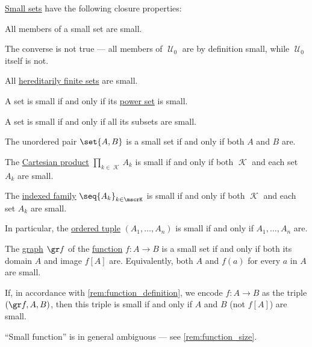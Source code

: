 \begin{proposition}\label{thm:small_set_closure}
  \hyperref[def:small_set]{Small sets} have the following closure properties:
  \begin{thmenum}
     All members of a small set are small.

    The converse is not true --- all members of \( \mscrU_0 \) are by definition small, while \( \mscrU_0 \) itself is not.

     All \hyperref[def:universe_of_hereditary_finite_sets]{hereditarily finite sets} are small.

     A set is small if and only if its \hyperref[def:power_set]{power set} is small.

     A set is small if and only if all its subsets are small.

     The unordered pair \( \set{ A, B } \) is a small set if and only if both \( A \) and \( B \) are.

     The \hyperref[def:cartesian_product]{Cartesian product} \( \prod_{k \in \mscrK} A_k \) is small if and only if both \( \mscrK \) and each set \( A_k \) are small.

     The \hyperref[def:indexed_family]{indexed family} \( \seq{ A_k }_{k \in \mscrK} \) is small if and only if both \( \mscrK \) and each set \( A_k \) are small.

    In particular, the \hyperref[def:ordered_tuple]{ordered tuple} \( (A_1, \ldots, A_n) \) is small if and only if \( A_1, \ldots, A_n \) are.

     The \hyperref[def:set_valued_function/graph]{graph} \( \gr f \) of the \hyperref[def:function]{function} \( f: A \to B \) is a small set if and only if both its domain \( A \) and image \( f[A] \) are. Equivalently, both \( A \) and \( f(a) \) for every \( a \) in \( A \) are small.

    If, in accordance with \cref{rem:function_definition}, we encode \( f: A \to B \) as the triple \( (\gr f, A, B) \), then this triple is small if and only if \( A \) and \( B \) (not \( f[A] \)) are small.

    \enquote{Small function} is in general ambiguous --- see \cref{rem:function_size}.


\end{thmenum}
\end{proposition}
